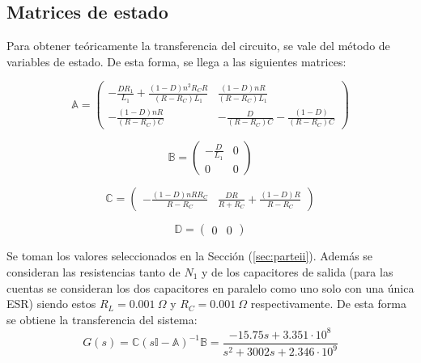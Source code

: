 %
%
%

\subsection{Matrices de estado}

Para obtener teóricamente la transferencia del circuito, se vale del método de variables de estado. De esta forma, se llega a las siguientes matrices:

\begin{multicols}{2}
\begin{equation}
\mathbb{A} = 
\begin{pmatrix}
-\frac{DR_1}{L_1} + \frac{(1 - D) n^2 R_C R}{(R - R_C) L_1} & \frac{(1-D) n R}{(R - R_C) L_1}\\
-\frac{(1 - D) n R}{(R - R_C) C} & -\frac{D }{(R - R_C) C} - \frac{(1 - D)}{(R - R_C) C}
\end{pmatrix}
\end{equation}

\begin{equation}
\mathbb{B} = 
\begin{pmatrix}
	-\frac{D}{L_1} & 0\\
	0 & 0
\end{pmatrix}
\end{equation}

\begin{equation}
\mathbb{C} = 
\begin{pmatrix}
	-\frac{(1-D)n R R_C}{R - R_C} & \frac{D R}{R + R_C} + \frac{(1-D) R}{R - R_C}
\end{pmatrix}
\end{equation}

\begin{equation}
\mathbb{D} = 
\begin{pmatrix}
	0 & 0
\end{pmatrix}
\end{equation}
\end{multicols}

Se toman los valores seleccionados en la Sección (\ref{sec:parteii}). Además se consideran las resistencias tanto de $N_1$ y de los capacitores de salida (para las cuentas se consideran los dos capacitores en paralelo como uno solo con una única ESR) siendo estos $R_L = 0.001 \ \Omega$ y $R_C = 0.001 \ \Omega$ respectivamente. De esta forma se obtiene la transferencia del sistema:
\begin{equation}
	G(s) = \mathbb{C} \left(s \mathbb{I} - \mathbb{A} \right)^{-1} \mathbb{B} = \frac{-15.75 s + 3.351 \cdot 10^{8}}{s^2 + 3002s + 2.346 \cdot 10^{9}}
\end{equation}

